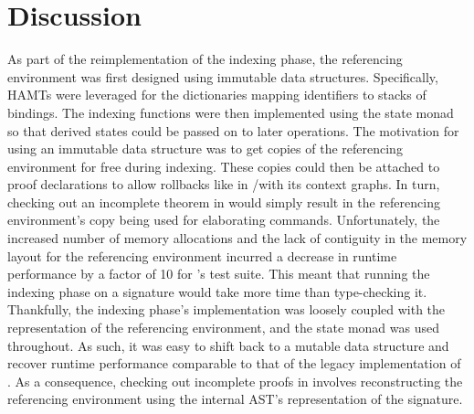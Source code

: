 \section{Discussion}

As part of the reimplementation of the indexing phase, the referencing environment was first designed using immutable data structures.
Specifically, \acp{HAMT} were leveraged for the dictionaries mapping identifiers to stacks of bindings.
The indexing functions were then implemented using the state monad so that derived states could be passed on to later operations.
The motivation for using an immutable data structure was to get copies of the referencing environment for free during indexing.
These copies could then be attached to proof declarations to allow rollbacks like in \Isabelle/\Isar with its context graphs.
In turn, checking out an incomplete theorem in \Harpoon would simply result in the referencing environment's copy being used for elaborating commands.
Unfortunately, the increased number of memory allocations and the lack of contiguity in the memory layout for the referencing environment incurred a decrease in runtime performance by a factor of 10 for \Beluga's test suite.
This meant that running the indexing phase on a signature would take more time than type-checking it.
Thankfully, the indexing phase's implementation was loosely coupled with the representation of the referencing environment, and the state monad was used throughout.
As such, it was easy to shift back to a mutable data structure and recover runtime performance comparable to that of the legacy implementation of \Beluga.
As a consequence, checking out incomplete proofs in \Harpoon involves reconstructing the referencing environment using the internal \ac{AST}'s representation of the signature.


